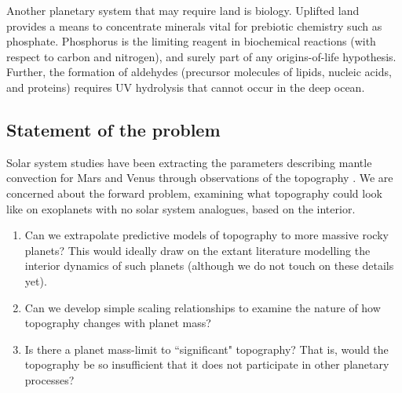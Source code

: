 Another planetary system that may require land is biology. Uplifted land provides a means to concentrate minerals vital for prebiotic chemistry such as phosphate. Phosphorus is the limiting reagent in biochemical reactions (with respect to carbon and nitrogen), and surely part of any origins-of-life hypothesis. Further, the formation of aldehydes (precursor molecules of lipids, nucleic acids, and proteins) requires UV hydrolysis that cannot occur in the deep ocean.

\subsection{Statement of the problem}

Solar system studies have been extracting the parameters describing mantle convection for Mars and Venus through observations of the topography \citep[e.g.,][]{Wieczorek2015, Tosi2019}. We are concerned about the forward problem, examining what topography could look like on exoplanets with no solar system analogues, based on the interior. 

\begin{enumerate}
\item Can we extrapolate predictive models of topography to more massive rocky planets? This would ideally draw on the extant literature modelling the interior dynamics of such planets (although we do not touch on these details yet).
\item Can we develop simple scaling relationships to examine the nature of how topography changes with planet mass?
\item Is there a planet mass-limit to ``significant" topography? That is, would the topography be so insufficient that it does not participate in other planetary processes?
\end{enumerate}
